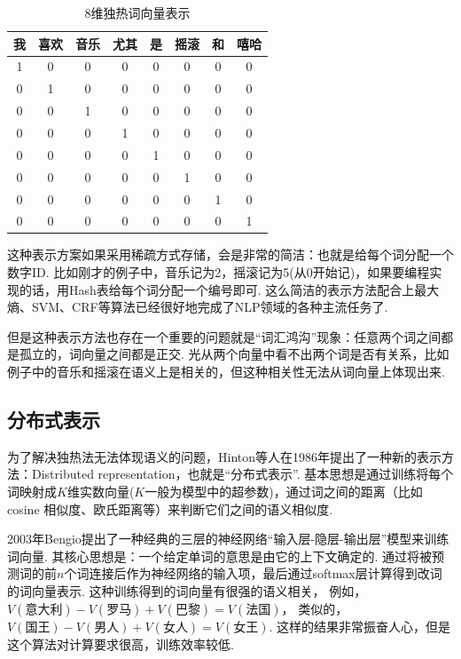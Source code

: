\documentclass[bachelor,winfonts]{jnuthesis}
\begin{document}
\begin{table}[h!]
  \centering
  \begin{tabular}{cccccccc}
    \toprule
    \textbf{我} & \textbf{喜欢} & \textbf{音乐} & \textbf{尤其} & \textbf{是} & \textbf{摇滚}  & \textbf{和} & \textbf{嘻哈}  \\
    \midrule
    1 & 0 & 0 & 0 & 0 & 0 & 0 & 0 \\
    0 & 1 & 0 & 0 & 0 & 0 & 0 & 0 \\
    0 & 0 & 1 & 0 & 0 & 0 & 0 & 0 \\
    0 & 0 & 0 & 1 & 0 & 0 & 0 & 0 \\
    0 & 0 & 0 & 0 & 1 & 0 & 0 & 0 \\
    0 & 0 & 0 & 0 & 0 & 1 & 0 & 0 \\
    0 & 0 & 0 & 0 & 0 & 0 & 1 & 0 \\
    0 & 0 & 0 & 0 & 0 & 0 & 0 & 1 \\
    \bottomrule
  \end{tabular}
  \caption{8维独热词向量表示}\label{table:3t1}
\end{table}

这种表示方案如果采用稀疏方式存储，会是非常的简洁：也就是给每个词分配一个数字ID.
比如刚才的例子中，音乐记为2，摇滚记为5(从0开始记)，如果要编程实现的话，用Hash表给每个词分配一个编号即可.
这么简洁的表示方法配合上最大熵、SVM、CRF等算法已经很好地完成了NLP领域的各种主流任务了.

但是这种表示方法也存在一个重要的问题就是“词汇鸿沟”现象：任意两个词之间都是孤立的，词向量之间都是正交.
光从两个向量中看不出两个词是否有关系，比如例子中的音乐和摇滚在语义上是相关的，但这种相关性无法从词向量上体现出来.

\subsection{分布式表示}
为了解决独热法无法体现语义的问题，Hinton等人\cite{Rumelhart1986Learning}在1986年提出了一种新的表示方法：Distributed representation，也就是“分布式表示”.
基本思想是通过训练将每个词映射成$K$维实数向量($K$一般为模型中的超参数)，通过词之间的距离（比如 cosine 相似度、欧氏距离等）来判断它们之间的语义相似度.

2003年Bengio\cite{Turian2010Word}提出了一种经典的三层的神经网络“输入层-隐层-输出层”模型来训练词向量.
其核心思想是：一个给定单词的意思是由它的上下文确定的.
通过将被预测词的前$n$个词连接后作为神经网络的输入项，最后通过softmax层计算得到改词的词向量表示.
这种训练得到的词向量有很强的语义相关，
例如，$V(\mbox{意大利})-V(\mbox{罗马})+V(\mbox{巴黎}) = V(\mbox{法国})$，
类似的，$V(\mbox{国王})-V(\mbox{男人})+V(\mbox{女人})=V(\mbox{女王})$.
这样的结果非常振奋人心，但是这个算法对计算要求很高，训练效率较低.
\end{document}
